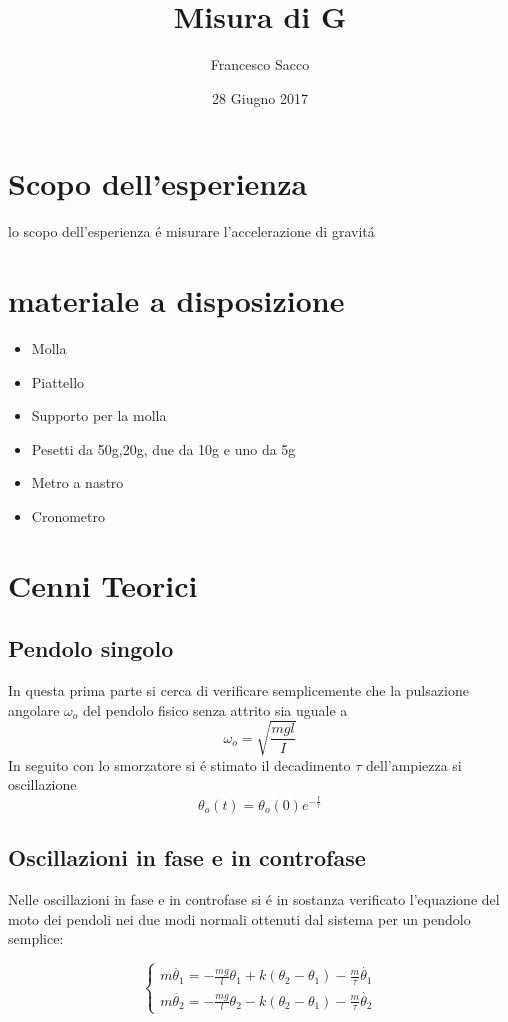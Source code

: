 \documentclass{exam}
\date{28 Giugno 2017}
\title{Misura di G}
\author{Francesco Sacco}
\begin{document}
	\maketitle
	\section{Scopo dell'esperienza}
		lo scopo dell'esperienza \'e misurare l'accelerazione di gravit\'a

	\section{materiale a disposizione}
		\begin{itemize}
			\item Molla
			\item Piattello
			\item Supporto per la molla
			\item Pesetti da 50g,20g, due da 10g e uno da 5g
			\item Metro a nastro
			\item Cronometro
		\end{itemize}
	\section{Cenni Teorici}
		\subsection{Pendolo singolo}
			In questa prima parte si cerca di verificare semplicemente che la pulsazione angolare $\omega_o$ del pendolo fisico senza attrito sia uguale a 
			\begin{equation}
				\omega_o=\sqrt{\frac{mgl}{I}}
			\end{equation}
			In seguito con lo smorzatore si \'e stimato il decadimento $\tau $ dell'ampiezza si oscillazione
			\begin{equation}
				\theta_o(t)=\theta_o(0)e^{-\frac{t}{\tau}}
			\end{equation}
	\subsection{Oscillazioni in fase e in controfase}
		Nelle oscillazioni in fase e in controfase si \'e in sostanza verificato l'equazione del moto dei pendoli nei due modi normali ottenuti dal sistema per un pendolo semplice:

		\begin{equation}
			\begin{cases} 
				m \ddot{\theta_{1}}=-\frac{mg}{l}\theta_1 + k(\theta_2-\theta_1) -\frac{m}{\tau}\dot{\theta_1} \\
				m \ddot{\theta_{2}}=-\frac{mg}{l}\theta_2 -  k(\theta_2-\theta_1) - \frac{m}{\tau} \dot{\theta_{2}}
			\end{cases}
		\end{equation}
\end{document}
